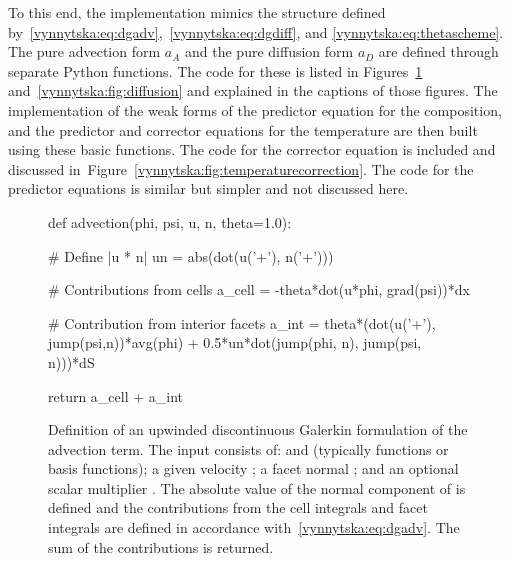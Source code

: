 To this end, the implementation mimics the structure defined
by~\eqref{vynnytska:eq:dgadv},~\eqref{vynnytska:eq:dgdiff}, and
\eqref{vynnytska:eq:thetascheme}. The pure advection form $a_A$ and
the pure diffusion form $a_D$ are defined through separate Python
functions. The code for these is listed in
Figures~\ref{vynnytska:fig:advection}
and~\ref{vynnytska:fig:diffusion} and explained in the captions of
those figures. The implementation of the weak forms of the predictor
equation for the composition, and the predictor and corrector
equations for the temperature are then built using these basic functions. The
code for the corrector equation is included and discussed
in~Figure~\ref{vynnytska:fig:temperaturecorrection}. The code for the
predictor equations is similar but simpler and not discussed
here.
\begin{figure}
    \begin{python}
def advection(phi, psi, u, n, theta=1.0):

    # Define |u * n|
    un = abs(dot(u('+'), n('+')))

    # Contributions from cells
    a_cell = -theta*dot(u*phi, grad(psi))*dx

    # Contribution from interior facets
    a_int = theta*(dot(u('+'), jump(psi,n))*avg(phi)
        + 0.5*un*dot(jump(phi, n), jump(psi, n)))*dS

    return a_cell + a_int
    \end{python}
  \caption{Definition of an upwinded discontinuous Galerkin
    formulation of the advection term. The input consists of:
     and  (typically functions or basis
    functions); a given velocity ; a facet normal ;
    and an optional scalar multiplier . The absolute
    value of the normal component of  is defined and the
    contributions from the cell integrals and facet integrals are
    defined in accordance with~\eqref{vynnytska:eq:dgadv}. The sum
    of the contributions is returned.}
  \label{vynnytska:fig:advection}
\end{figure}
%
